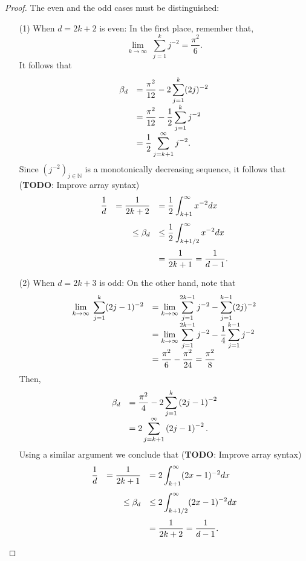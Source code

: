 \documentclass[12pt]{exam}
\def\N{\ensuremath{\mathbb{N}}}
\theoremstyle{remark}
\begin{document}
\begin{proof}
  The even and the odd cases must be distinguished:
  \begin{enumerate}
    \item[(1)] When $d = 2k+2$ is even:
    In the first place, remember that,
    \[ \lim_{k\to\infty}\; \sum_{j = 1}^{k} j^{-2} = \frac{\pi^2}{6}.\] 
    It follows that
    \[\everymath{\displaystyle}
      \begin{array}{rl}
        \beta_d & = \frac{\pi^2}{12}- 2 \sum_{j = 1}^{k} (2j)^{-2}\\
        & = \frac{\pi^2}{12} - \frac{1}{2} \sum_{j = 1}^{k} j^{-2}\\
        & = \frac{1}{2} \sum_{j = k+1}^{\infty} j^{-2}.
      \end{array}      
     \]
    Since $(j^{-2})_{j \in \N}$ is a monotonically decreasing sequence, it follows that (\textbf{TODO}: Improve array syntax)
    \[\everymath{\displaystyle} 
      \begin{array}{rrl}
        \frac{1}{d}   & = \frac{1}{2k+2}  & = \frac{1}{2} \int_{k+1}^{\infty}x^{-2} dx\\[5mm]
      & \leq \beta_d  & \leq  \frac{1}{2} \int_{k+1/2}^{\infty}x^{-2} dx\\[5mm]
      & & = \frac{1}{2k+1} = \frac{1}{d-1}.
    \end{array}  \] 

    \item[(2)] When $d = 2k+3$ is odd:
    On the other hand, note that
    \[\everymath{\displaystyle} 
      \begin{array}{rl}
      \lim_{k\to\infty} \; \sum_{j = 1}^{k} (2j-1)^{-2} 
      & = \lim_{k\to\infty} \sum_{j = 1}^{2k-1} j^{-2} - \sum_{j = 1}^{k-1} (2j)^{-2}\\
      & = \lim_{k\to\infty} \sum_{j = 1}^{2k-1} j^{-2} - \frac{1}{4}\sum_{j = 1}^{k-1} j^{-2}\\
      & = \frac{\pi^2}{6}-\frac{\pi^2}{24} = \frac{\pi^2}{8}
    \end{array}\]
    Then,
    \[\everymath{\displaystyle}
    \begin{array}{rl}
      \beta_d & = \frac{\pi^2}{4} - 2 \sum_{j = 1}^{k} \left(2j-1\right)^{-2}\\
      & = 2\sum_{j = k+1}^{\infty}\left(2j-1\right)^{-2}.\\
    \end{array}      
   \]
   Using a similar argument we conclude that (\textbf{TODO}: Improve array syntax)
   \[\everymath{\displaystyle} 
      \begin{array}{rrl}
        \frac{1}{d}& = \frac{1}{2k+1}  & = 2 \int_{k+1}^{\infty}(2x-1)^{-2} dx\\[5mm]
      & \leq \beta_d    & \leq  2 \int_{k+1/2}^{\infty}(2x-1)^{-2} dx\\[5mm]
      &  & = \frac{1}{2k+2} = \frac{1}{d-1}.
    \end{array}  \] 
  \end{enumerate}
\end{proof}
\end{document}
